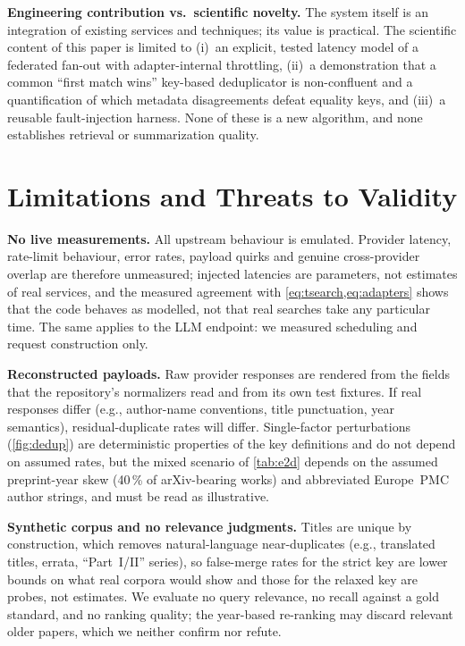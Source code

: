 \documentclass[conference]{IEEEtran}
\begin{document}
\textbf{Engineering contribution vs.\ scientific novelty.} The system itself is an integration of existing services and techniques; its value is practical. The scientific content of this paper is limited to (i)~an explicit, tested latency model of a federated fan-out with adapter-internal throttling, (ii)~a demonstration that a common ``first match wins'' key-based deduplicator is non-confluent and a quantification of which metadata disagreements defeat equality keys, and (iii)~a reusable fault-injection harness. None of these is a new algorithm, and none establishes retrieval or summarization quality.

\section{Limitations and Threats to Validity}
\label{sec:limits}

\textbf{No live measurements.} All upstream behaviour is emulated. Provider latency, rate-limit behaviour, error rates, payload quirks and genuine cross-provider overlap are therefore unmeasured; injected latencies are parameters, not estimates of real services, and the measured agreement with \cref{eq:tsearch,eq:adapters} shows that the code behaves as modelled, not that real searches take any particular time. The same applies to the LLM endpoint: we measured scheduling and request construction only.

\textbf{Reconstructed payloads.} Raw provider responses are rendered from the fields that the repository's normalizers read and from its own test fixtures. If real responses differ (e.g., author-name conventions, title punctuation, year semantics), residual-duplicate rates will differ. Single-factor perturbations (\cref{fig:dedup}) are deterministic properties of the key definitions and do not depend on assumed rates, but the mixed scenario of \cref{tab:e2d} depends on the assumed preprint-year skew (40\,\% of arXiv-bearing works) and abbreviated Europe~PMC author strings, and must be read as illustrative.

\textbf{Synthetic corpus and no relevance judgments.} Titles are unique by construction, which removes natural-language near-duplicates (e.g., translated titles, errata, ``Part~I/II'' series), so false-merge rates for the strict key are lower bounds on what real corpora would show and those for the relaxed key are probes, not estimates. We evaluate no query relevance, no recall against a gold standard, and no ranking quality; the year-based re-ranking may discard relevant older papers, which we neither confirm nor refute.
\end{document}
